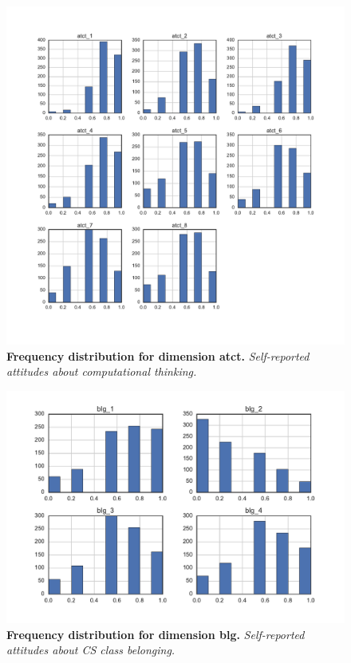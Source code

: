 \begin{figure}[!hbtp]
\centering
    \caption{\textbf{Frequency distribution for dimension atct. }\textit{Self-reported attitudes about computational thinking.}}\label{atct_dimension}
    \includegraphics[width=1\textwidth]{figures/atct_dimension}
\end{figure}

\begin{figure}[!hbtp]
\centering
    \caption{\textbf{Frequency distribution for dimension blg. }\textit{Self-reported attitudes about CS class belonging.}}\label{blg_dimension}
    \includegraphics[width=1\textwidth]{figures/blg_dimension}
\end{figure}

